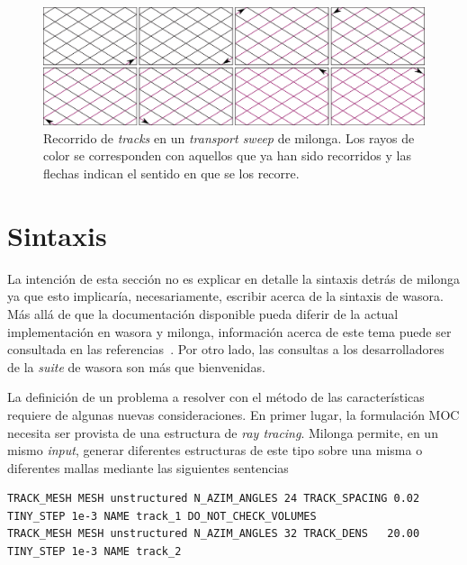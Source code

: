\documentclass[11pt]{article}
\numberwithin{equation}{section}
\begin{document}
\begin{figure}[!ht]
 \begin{center}
  \includegraphics[width=1.0\linewidth]{graficos/solver/cyclic-tracks-1.pdf}
 \end{center}
\caption{\label{fig:tracks-solver} Recorrido de \emph{tracks} en un \emph{transport sweep} de milonga. Los rayos de color se corresponden con aquellos que ya han sido recorridos y las flechas indican el sentido en que se los recorre.}
\end{figure}

\newpage
\section{Sintaxis}

La intenci\'on de esta secci\'on no es explicar en detalle la sintaxis detr\'as de milonga ya que esto implicar\'ia, necesariamente, escribir acerca de la sintaxis de wasora. M\'as all\'a de que la documentaci\'on disponible pueda diferir de la actual implementación en wasora y milonga, información acerca de este tema puede ser consultada en las referencias~\cite{wasora, milongabase2010, milonga-db, enief-milonga-2014}. Por otro lado, las consultas a los desarrolladores de la \emph{suite} de wasora son m\'as que bienvenidas. 

La definici\'on de un problema a resolver con el m\'etodo de las características requiere de algunas nuevas consideraciones. En primer lugar, la formulación MOC necesita ser provista de una estructura de \emph{ray tracing}. Milonga permite, en un mismo \emph{input}, generar diferentes estructuras de este tipo sobre una misma o diferentes mallas mediante las siguientes sentencias

\begin{lstlisting}[style=wasora]
TRACK_MESH MESH unstructured N_AZIM_ANGLES 24 TRACK_SPACING 0.02 TINY_STEP 1e-3 NAME track_1 DO_NOT_CHECK_VOLUMES
TRACK_MESH MESH unstructured N_AZIM_ANGLES 32 TRACK_DENS   20.00 TINY_STEP 1e-3 NAME track_2
\end{lstlisting}
\end{document}
